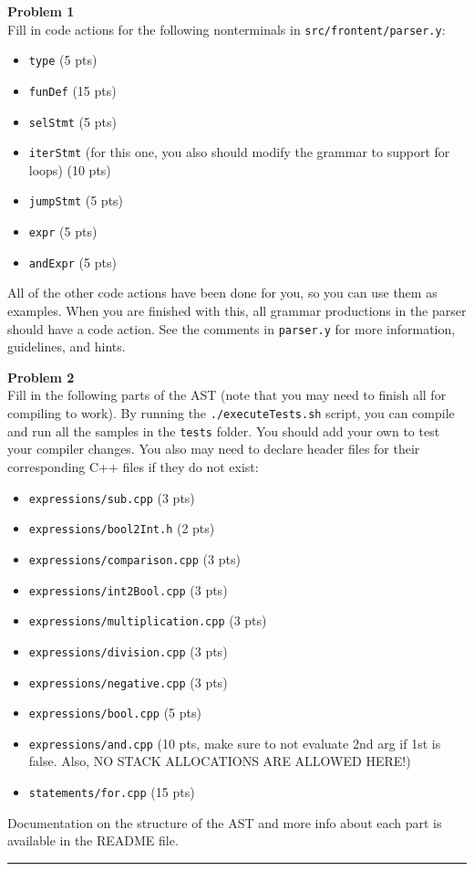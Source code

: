 \documentclass[a4paper, 11pt]{article}
\newenvironment{problem}[2][Problem]
    { \begin{mdframed}[backgroundcolor=gray!20] \textbf{#1 #2} \\}
    {  \end{mdframed}}
\begin{document}
\begin{problem}{1}
  Fill in code actions for the following nonterminals in \verb|src/frontent/parser.y|:
  \begin{itemize}
  \item \verb|type| (5 pts)
  \item \verb|funDef| (15 pts)
  \item \verb|selStmt| (5 pts)
  \item \verb|iterStmt| (for this one, you also should modify the grammar to support for loops) (10 pts)
  \item \verb|jumpStmt| (5 pts)
  \item \verb|expr| (5 pts)
  \item \verb|andExpr| (5 pts)
  \end{itemize}
  All of the other code actions have been done for you, so you can use them as examples. When you are finished with this, all grammar productions in the parser should have a code action. See the comments in \verb|parser.y| for more information, guidelines, and hints.
\end{problem}

\begin{problem}{2}
	Fill in the following parts of the AST (note that you may need to finish all for compiling to work). By running the \verb|./executeTests.sh| script, you can compile and run all the samples in the \verb|tests| folder. You should add your own to test your compiler changes. You also may need to declare header files for their corresponding C++ files if they do not exist:
	\begin{itemize}
	\item \verb|expressions/sub.cpp| (3 pts)
	\item \verb|expressions/bool2Int.h| (2 pts)
	\item \verb|expressions/comparison.cpp| (3 pts)
	\item \verb|expressions/int2Bool.cpp| (3 pts)
	\item \verb|expressions/multiplication.cpp| (3 pts)
	\item \verb|expressions/division.cpp| (3 pts)
	\item \verb|expressions/negative.cpp| (3 pts)
	\item \verb|expressions/bool.cpp| (5 pts)
	\item \verb|expressions/and.cpp| (10 pts, make sure to not evaluate 2nd arg if 1st is false. Also, NO STACK ALLOCATIONS ARE ALLOWED HERE!)
	\item \verb|statements/for.cpp| (15 pts)
	\end{itemize}
	Documentation on the structure of the AST and more info about each part is available in the README file.
\end{problem}

%
\noindent\rule{7in}{2.8pt}
\end{document}
